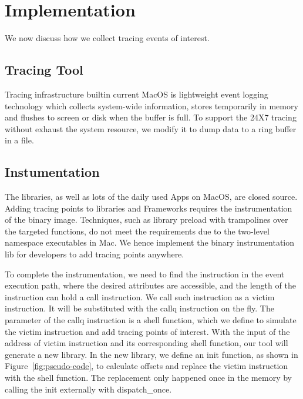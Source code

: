 \section{Implementation}
We now discuss how we collect tracing events of interest.

\subsection{Tracing Tool}
Tracing infrastructure builtin current MacOS is lightweight event logging technology which collects system-wide information, stores temporarily in memory and flushes to screen or disk when the buffer is full.
To support the 24X7 tracing without exhaust the system resource, we modify it to dump data to a ring buffer in a file.

\subsection{Instumentation}
The libraries, as well as lots of the daily used Apps on MacOS, are closed source.
Adding tracing points to libraries and Frameworks requires the instrumentation of the binary image.
Techniques, such as library preload with trampolines over the targeted functions, do not meet the requirements due to the two-level namespace executables in Mac.
We hence implement the binary instrumentation lib for developers to add tracing points anywhere.

To complete the instrumentation, we need to find the instruction in the event execution path, where the desired attributes are accessible, and the length of the instruction can hold a call instruction.
We call such instruction as a victim instruction.
It will be substituted with the callq instruction on the fly.
The parameter of the callq instruction is a shell function, which we define to simulate the victim instruction and add tracing points of interest.
With the input of the address of victim instruction and its corresponding shell function, our tool will generate a new library.
In the new library, we define an init function, as shown in Figure~\ref{fig:pseudo-code}, to calculate offsets and replace the victim instruction with the shell function.
The replacement only happened once in the memory by calling the init externally with dispatch\_once.

